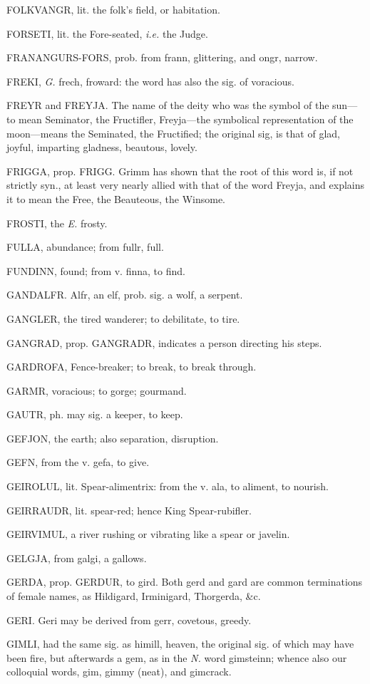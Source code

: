 FOLKVANGR, lit. the folk's field, or habitation.

FORSETI, lit. the Fore-seated, \emph{i.e.} the Judge.

FRANANGURS-FORS, prob. from frann, glittering, and ongr, narrow.

FREKI, \emph{G.} frech, froward: the word has also the sig. of voracious.

FREYR and FREYJA. The name of the deity who was the symbol of the
sun—to mean Seminator, the Fructifler, Freyja—the symbolical
representation of the moon—means the Seminated, the Fructified; the
original sig, is that of glad, joyful, imparting gladness, beautous,
lovely.

FRIGGA, prop. FRIGG. Grimm has shown that the root of this word is, if
not strictly syn., at least very nearly allied with that of the word
Freyja, and explains it to mean the Free, the Beauteous, the Winsome.

FROSTI, the \emph{E.} frosty.

FULLA, abundance; from fullr, full.

FUNDINN, found; from v. finna, to find.

GANDALFR. Alfr, an elf, prob. sig. a wolf, a serpent.

GANGLER, the tired wanderer; to debilitate, to tire.

GANGRAD, prop. GANGRADR, indicates a person directing his steps.

GARDROFA, Fence-breaker; to break, to break through.

GARMR, voracious; to gorge; gourmand.

GAUTR, ph. may sig. a keeper, to keep.

GEFJON, the earth; also separation, disruption.

GEFN, from the v. gefa, to give.

GEIROLUL, lit. Spear-alimentrix: from the v. ala, to aliment, to
nourish.

GEIRRAUDR, lit. spear-red; hence King Spear-rubifler.

GEIRVIMUL, a river rushing or vibrating like a spear or javelin.

GELGJA, from galgi, a gallows.

GERDA, prop. GERDUR, to gird. Both gerd and gard are common
terminations of female names, as Hildigard, Irminigard, Thorgerda, \&c.

GERI. Geri may be derived from gerr, covetous, greedy.

GIMLI, had the same sig. as himill, heaven, the original sig. of which
may have been fire, but afterwards a gem, as in the \emph{N.} word
gimsteinn; whence also our colloquial words, gim, gimmy (neat), and
gimcrack.

